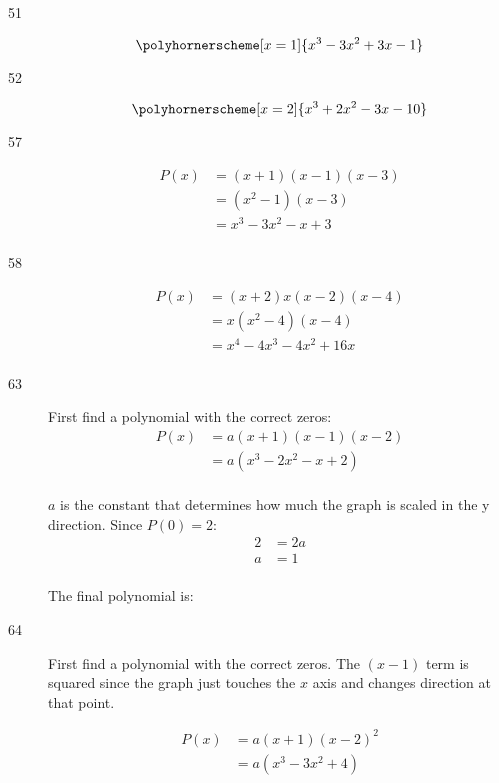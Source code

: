 \documentclass{exam}
\begin{document}
\begin{description}
      \item[51]
        \[
          \polyhornerscheme[x = 1]{x^3 - 3x^2 + 3x - 1}
        \]

      \item[52]
        \[
          \polyhornerscheme[x = 2]{x^3 + 2x^2 - 3x - 10}
        \]

      \item[57]
        \begin{align*}
          P(x) &= (x + 1)(x - 1)(x - 3) \\
          &= (x^2 - 1)(x - 3) \\
          &= \boxed{x^3 - 3x^2 - x + 3} \\
        \end{align*}

      \item[58]
        \begin{align*}
          P(x) &= (x + 2)x(x - 2)(x - 4) \\
               &= x(x^2 - 4)(x - 4) \\
               &= \boxed{x^4 - 4x^3 - 4x^2 + 16x} \\
        \end{align*}

      \item[63]
        First find a polynomial with the correct zeros:
        \begin{align*}
          P(x) &= a(x + 1)(x - 1)(x - 2) \\
               &= a(x^3 - 2x^2 - x + 2) \\
        \end{align*}

        $a$ is the constant that determines how much the graph is scaled in the y direction.  Since $P(0) = 2$:
        \begin{align*}
          2 &= 2a \\
          a &= 1 \\
        \end{align*}

        The final polynomial is: 

      \item[64]
        First find a polynomial with the correct zeros.  The $(x - 1)$ term is squared since the graph just touches the
        $x$ axis and changes direction at that point.

        \begin{align*}
          P(x) &= a(x + 1)(x - 2)^2 \\
               &= a(x^3 - 3x^2 + 4) \\
        \end{align*}


\end{description}
\end{document}
